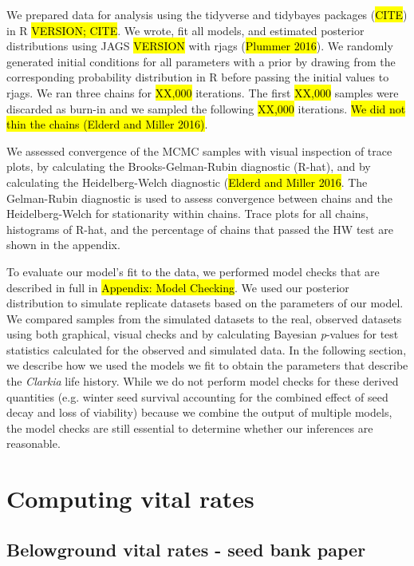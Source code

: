 \documentclass[12pt, oneside, titlepage]{article}   	%
\begin{document}
We prepared data for analysis using the tidyverse and tidybayes packages (\hl{CITE}) in R \hl{VERSION; CITE}. We wrote, fit all models, and estimated posterior distributions using JAGS \hl{VERSION} with rjags (\hl{Plummer 2016}). We randomly generated initial conditions for all parameters with a prior by drawing from the corresponding probability distribution in R before passing the initial values to rjags. We ran three chains for \hl{XX,000} iterations. The first \hl{XX,000} samples were discarded as burn-in and we sampled the following \hl{XX,000} iterations. \hl{We did not thin the chains (Elderd and Miller 2016)}.

We assessed convergence of the MCMC samples with visual inspection of trace plots, by calculating the Brooks-Gelman-Rubin diagnostic (R-hat), and by calculating the Heidelberg-Welch diagnostic (\hl{Elderd and Miller 2016}. The Gelman-Rubin diagnostic is used to assess convergence between chains and the Heidelberg-Welch for stationarity within chains. Trace plots for all chains, histograms of R-hat, and the percentage of chains that passed the HW test are shown in the appendix. 
 
To evaluate our model's fit to the data, we performed model checks that are described in full in \hl{Appendix: Model Checking}. We used our posterior distribution to simulate replicate datasets based on the parameters of our model. We compared samples from the simulated datasets to the real, observed datasets using both graphical, visual checks and by calculating Bayesian \textit{p}-values for test statistics calculated for the observed and simulated data. In the following section, we describe how we used the models we fit to obtain the parameters that describe the \textit{Clarkia} life history. While we do not perform model checks for these derived quantities (e.g. winter seed survival accounting for the combined effect of seed decay and loss of viability) because we combine the output of multiple models, the model checks are still essential to determine whether our inferences are reasonable.

\section{Computing vital rates}

\subsection{Belowground vital rates - seed bank paper}
\end{document}
